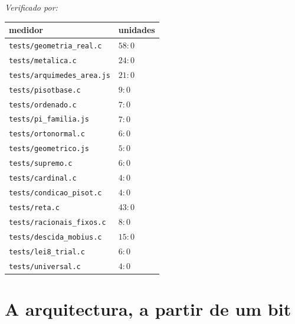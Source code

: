 \documentclass[11pt,a4paper]{article}
\newcommand{\code}[1]{\texttt{\small #1}}
\begin{document}
\medskip
\noindent\emph{Verificado por:}
\begin{center}\small
\begin{tabular}{@{}ll@{}}
\toprule
medidor & unidades \\
\midrule
\code{tests/geometria\_real.c}    & $58{:}0$ \\
\code{tests/metalica.c}           & $24{:}0$ \\
\code{tests/arquimedes\_area.js}  & $21{:}0$ \\
\code{tests/pisotbase.c}          & $9{:}0$ \\
\code{tests/ordenado.c}           & $7{:}0$ \\
\code{tests/pi\_familia.js}       & $7{:}0$ \\
\code{tests/ortonormal.c}         & $6{:}0$ \\
\code{tests/geometrico.js}        & $5{:}0$ \\
\midrule
\code{tests/supremo.c}            & $6{:}0$ \\
\code{tests/cardinal.c}           & $4{:}0$ \\
\code{tests/condicao\_pisot.c}    & $4{:}0$ \\
\code{tests/reta.c}              & $43{:}0$ \\
\code{tests/racionais\_fixos.c}   & $8{:}0$ \\
\code{tests/descida\_mobius.c}    & $15{:}0$ \\
\code{tests/lei8\_trial.c}       & $6{:}0$ \\
\code{tests/universal.c}          & $4{:}0$ \\
\bottomrule
\end{tabular}
\end{center}


%
\section{A arquitectura, a partir de um bit}\label{sec:do-bit}
\end{document}

